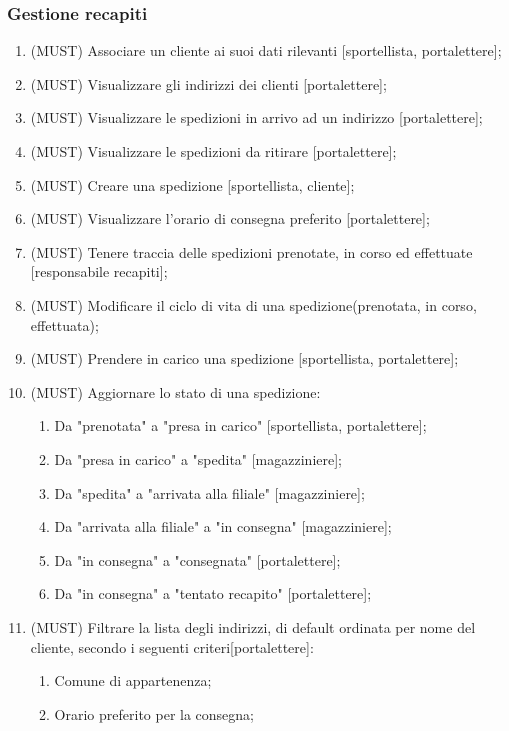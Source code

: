 \subsubsection{Gestione recapiti}
\begin{enumerate}
  \item{(MUST)} Associare un cliente ai suoi dati rilevanti [sportellista, portalettere];
  \item{(MUST)} Visualizzare gli indirizzi dei clienti [portalettere];
  \item{(MUST)} Visualizzare le spedizioni in arrivo ad un indirizzo [portalettere];
  \item{(MUST)} Visualizzare le spedizioni da ritirare [portalettere];
  \item{(MUST)} Creare una spedizione [sportellista, cliente];
  \item{(MUST)} Visualizzare l'orario di consegna preferito [portalettere];
  \item{(MUST)} Tenere traccia delle spedizioni prenotate, in corso ed effettuate [responsabile recapiti];
  \item{(MUST)} Modificare il ciclo di vita di una spedizione(prenotata, in corso, effettuata);
  \item{(MUST)} Prendere in carico una spedizione [sportellista, portalettere];
  \item{(MUST)} Aggiornare lo stato di una spedizione:
    \begin{enumerate}
      \item{Da "prenotata" a "presa in carico" [sportellista, portalettere]};
      \item{Da "presa in carico" a "spedita" [magazziniere]};
      \item{Da "spedita" a "arrivata alla filiale" [magazziniere]};
      \item{Da "arrivata alla filiale" a "in consegna" [magazziniere]};
      \item{Da "in consegna" a "consegnata" [portalettere]};
      \item{Da "in consegna" a "tentato recapito" [portalettere]};
    \end{enumerate}
  \item{(MUST)} Filtrare la lista degli indirizzi, di default ordinata per nome del cliente, secondo i seguenti criteri[portalettere]:
    \begin{enumerate}
      \item{Comune di appartenenza};
      \item{Orario preferito per la consegna};

\end{enumerate}
\end{enumerate}

